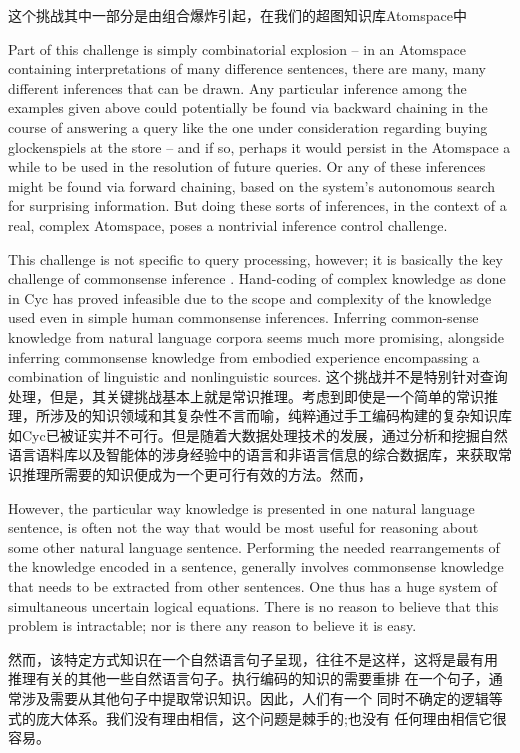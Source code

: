 这个挑战其中一部分是由组合爆炸引起，在我们的超图知识库Atomspace中

Part of this challenge is simply combinatorial explosion -- in an Atomspace
containing interpretations of many difference sentences, there are many, many different inferences that can be drawn.  
Any particular inference among the examples given above could potentially be found via backward chaining in the course of answering a query like the one 
under consideration regarding buying glockenspiels at the store -- and if so, perhaps it would persist in the Atomspace
a while to be used in the resolution of future queries.  Or any of these inferences might be found via forward chaining, based on the
system's autonomous search for surprising information.   But doing these sorts of inferences, in the context of a real, complex Atomspace,
poses a nontrivial inference control challenge.   

This challenge is not specific to query processing, however; it is basically 
the key challenge of commonsense inference \cite{RWR}.   Hand-coding of complex knowledge as done in Cyc \cite{Lenat1990}
has proved infeasible due to the scope and complexity of the knowledge used even in simple human commonsense inferences.
Inferring common-sense knowledge from natural language corpora seems much more promising, alongside inferring
commonsense knowledge from embodied experience encompassing a combination of linguistic and nonlinguistic sources.
这个挑战并不是特别针对查询处理，但是，其关键挑战基本上就是常识推理\cite{RWR}。考虑到即使是一个简单的常识推理，所涉及的知识领域和其复杂性不言而喻，纯粹通过手工编码构建的复杂知识库如Cyc\cite{Lenat1990}已被证实并不可行。但是随着大数据处理技术的发展，通过分析和挖掘自然语言语料库以及智能体的涉身经验中的语言和非语言信息的综合数据库，来获取常识推理所需要的知识便成为一个更可行有效的方法。然而，

However, the particular way knowledge is presented in one natural language sentence, is often not the way that would be most useful
for reasoning about some other natural language sentence.  Performing the needed rearrangements of the knowledge encoded
in a sentence, generally involves commonsense knowledge that needs to be extracted from other sentences.  One thus has a 
huge system of simultaneous uncertain logical equations.   There is no reason to believe that this problem is intractable; nor is there
any reason to believe it is easy.  

然而，该特定方式知识在一个自然语言句子呈现，往往不是这样，这将是最有用
推理有关的其他一些自然语言句子。执行编码的知识的需要重排
在一个句子，通常涉及需要从其他句子中提取常识知识。因此，人们有一个
同时不确定的逻辑等式的庞大体系。我们没有理由相信，这个问题是棘手的;也没有
任何理由相信它很容易。

